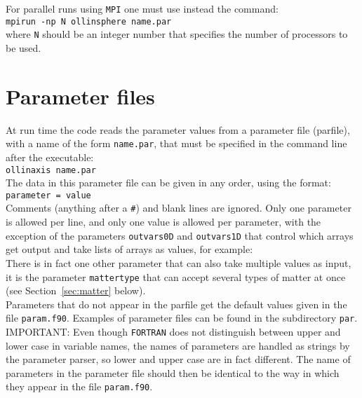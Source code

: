 \documentclass[12pt]{article}
\begin{document}
For parallel runs using \texttt{MPI} one must use instead the command:
\\

\texttt{mpirun -np N ollinsphere name.par} \\

where \texttt{N} should be an integer number that specifies the number
of processors to be used. \\



\section{Parameter files}
\label{sec:parfiles}

At run time the code reads the parameter values from a parameter file
(parfile), with a name of the form \texttt{name.par}, that must be
specified in the command line after the executable: \\

\texttt{ollinaxis  name.par} \\

The data in this parameter file can be given in any order, using the
format: \\

\texttt{parameter = value} \\

Comments (anything after a \texttt{\#}) and blank lines are ignored.
Only one parameter is allowed per line, and only one value is allowed
per parameter, with the exception of the parameters \texttt{outvars0D}
and \texttt{outvars1D} that control which arrays get output and take
lists of arrays as values, for example: \\


There is in fact one other parameter that can also take multiple
values as input, it is the parameter \texttt{mattertype} that can
accept several types of matter at once (see Section~\ref{sec:matter}
below).\\

Parameters that do not appear in the parfile get the default values
given in the file \texttt{param.f90}.  Examples of parameter files can
be found in the subdirectory \texttt{par}. \\

IMPORTANT: Even though \texttt{FORTRAN} does not distinguish between
upper and lower case in variable names, the names of parameters are
handled as strings by the parameter parser, so lower and upper case
are in fact different.  The name of parameters in the parameter file
should then be identical to the way in which they appear in the file
\texttt{param.f90}. \\
\end{document}
